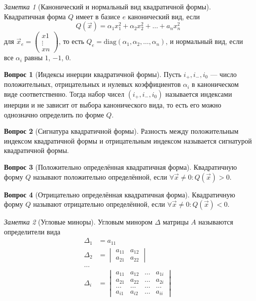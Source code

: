 \documentclass[a4paper,11pt]{article}
\theoremstyle{remark}
\newtheorem*{note}{Заметка}
\theoremstyle{definition}
\newtheorem{question}{Вопрос}
\begin{document}
\begin{note}[Канонический и нормальный вид квадратичной формы]
Квадратичная форма \(Q\) имеет в базисе \(e\) канонический вид, если
\begin{equation*}
	Q(\vec{x}) = \alpha_1x_1^2 + \alpha_2x_2^2 + \dots + a_nx_n^2
\end{equation*}
для \(\vec{x}_e = \begin{pmatrix}x1 \\ \vdots \\ xn \end{pmatrix}\), то есть \(Q_e = \mathrm{diag}(\alpha_1, \alpha_2, \dots, \alpha_n)\), и нормальный вид, если все \(\alpha_i\) равны \(1\), \(-1\), \(0\).
\end{note}


\begin{question}[Индексы инерции квадратичной формы]
Пусть \(i_+, i_-, i_0\) --- число положительных, отрицательных и нулевых коэффициентов \(\alpha{}_i\) в каноническом виде соответственно. Тогда набор чисел \((i_+, i_-, i_0)\) называется индексами инерции и не зависит от выбора канонического вида, то есть его можно однозначно определить по форме \(Q\). 
\end{question}


\begin{question}[Сигнатура квадратичной формы]
Разность между положительным индексом квадратичной формы и отрицательным индексом называется сигнатурой квадратичной формы.
\end{question}


\begin{question}[Положительно определённая квадратичная форма]
Квадратичную форму \(Q\) называют положительно определённой, если \(\forall \vec{x} \neq 0: Q(\vec{x}) > 0\).
\end{question}


\begin{question}[Отрицательно определённая квадратичная форма]
Квадратичную форму \(Q\) называют отрицательно определённой, если \(\forall \vec{x} \neq 0: Q(\vec{x}) < 0\).
\end{question}

\begin{note}[Угловые миноры]
Угловым минором \(\Delta\) матрицы \(A\) называются определители вида
\begin{align*}
	\Delta_1 &= a_{11} \\
	\Delta_2 &=
		\begin{vmatrix}
			a_{11} & a_{12} \\
			a_{21} & a_{22}
		\end{vmatrix} \\
	\dots \\
	\Delta_i &=
		\begin{vmatrix}
			a_{11} & a_{12} & \dots & a_{1i} \\
			a_{21} & a_{22} & \dots & a_{2i} \\
			\dots & \dots & \dots & \dots \\
			a_{i1} & a_{i2} & \dots & a_{ii}
		\end{vmatrix} 
\end{align*}
\end{note}
\end{document}
